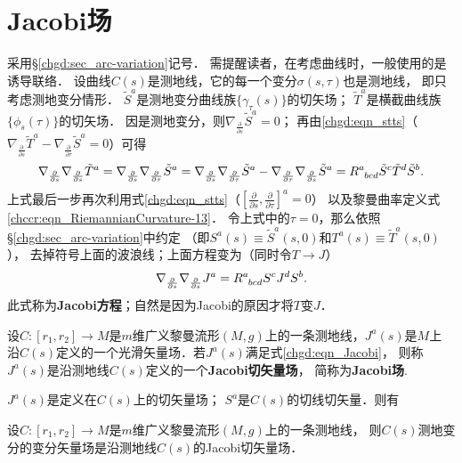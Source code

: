 \section{Jacobi场}\label{chgd:sec_Jacobi}
采用\S \ref{chgd:sec_arc-variation}记号．
需提醒读者，在考虑曲线时，一般使用的是诱导联络．
设曲线$C(s)$是测地线，它的每一个变分$\sigma(s,\tau)$也是测地线，
即只考虑{\kaishu 测地变分}情形．
$\tilde{S}^a$是测地变分曲线族$\{\gamma_\tau(s)\}$的切矢场；
$\tilde{T}^a$是横截曲线族$\{\phi_s(\tau)\}$的切矢场．
因是测地变分，则$ \nabla_{\frac{\partial}{\partial s}}\tilde{S}^a=0$；
再由\eqref{chgd:eqn_stts}（$ \nabla_{\frac{\partial}{\partial s}}\tilde{T}^a
- \nabla_{\frac{\partial}{\partial \tau}}\tilde{S}^a =0$）可得
\begin{equation}
    \nabla_{\frac{\partial}{\partial s}} \nabla_{\frac{\partial}{\partial s}}\tilde{T}^a
    =\nabla_{\frac{\partial}{\partial s}} \nabla_{\frac{\partial}{\partial \tau}}\tilde{S}^a
    =\nabla_{\frac{\partial}{\partial s}} \nabla_{\frac{\partial}{\partial \tau}}\tilde{S}^a
     -\nabla_{\frac{\partial}{\partial \tau}} \nabla_{\frac{\partial}{\partial s}}\tilde{S}^a
    =R^{a}_{\hphantom{a} bcd} \tilde{S}^c\tilde{T}^d \tilde{S}^b .
\end{equation}
上式最后一步再次利用式\eqref{chgd:eqn_stts}（$\left[\frac{\partial}{\partial s},
\frac{\partial}{\partial \tau}\right]^a = 0$）
以及黎曼曲率定义式\eqref{chccr:eqn_RiemannianCurvature-13}．
令上式中的$\tau=0$，那么依照\S \ref{chgd:sec_arc-variation}中约定
（即$S^a(s)\equiv \tilde{S}^a(s,0)$和$T^a(s)\equiv \tilde{T}^a(s,0)$），
去掉符号上面的波浪线；上面方程变为（同时令$T\to J$）
\begin{equation}\label{chgd:eqn_Jacobi}
    \nabla_{\frac{\partial}{\partial s}} \nabla_{\frac{\partial}{\partial s}}{J}^a =
    R^{a}_{\hphantom{a} bcd} {S}^c{J}^d {S}^b.
\end{equation}
此式称为{\bfseries \heiti Jacobi方程}；自然是因为Jacobi的原因才将$T$变$J$．


\begin{definition}\label{chgd:def_Jacobi-field}
    设$C:[r_1,r_2]\to M$是$m$维广义黎曼流形$(M,g)$上的一条测地线，$J^a(s)$是$M$上
    沿$C(s)$定义的一个光滑矢量场．若$J^a(s)$满足式\eqref{chgd:eqn_Jacobi}，
    则称$J^a(s)$是沿测地线$C(s)$定义的一个{\bfseries \heiti Jacobi切矢量场}，
    简称为{\bfseries \heiti Jacobi场}.
\end{definition}
$J^a(s)$是定义在$C(s)$上的切矢量场；
$S^a$是$C(s)$的切线切矢量．则有
\begin{proposition}\label{chgd:thm_vvJ}
    设$C:[r_1,r_2]\to M$是$m$维广义黎曼流形$(M,g)$上的一条测地线，
    则$C(s)$测地变分的变分矢量场是沿测地线$C(s)$的Jacobi切矢量场．
\end{proposition}

